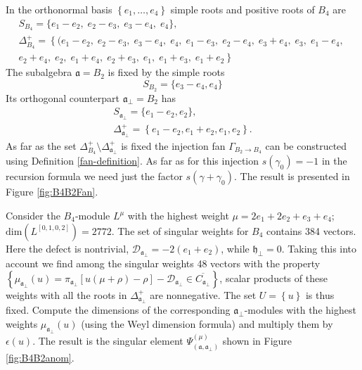 \documentclass[12pt]{iopart}
\theoremstyle{definition}
\newcommand{\af}{\mathfrak{a}}
\newcommand{\afb}{\mathfrak{a}_{\bot}}
\newcommand{\hf}{\mathfrak{h}}
\begin{document}
In the orthonormal basis $\left\{e_1,\dots,e_4\right\}$ simple roots and positive roots of $B_4$ are
\begin{eqnarray*}
  \label{eq:19}
  S_{B_4}= \{e_1 - e_2,\; e_2 - e_3,\; e_3 - e_4,\; e_4\},\\[2mm]
 \Delta^+_{B_4}=\left\{ (e_1 - e_2,\; e_2 - e_3,\; e_3 - e_4,\; e_4,\; e_1 - e_3,\; e_2 - e_4,\; e_3 + e_4,\; e_3,\; e_1 - e_4,\;\right.\\
 \left. e_2 + e_4,\; e_2,\; e_1 + e_4,\; e_2 + e_3,\; e_1,\; e_1 + e_3,\; e_1 + e_2\right\}
\end{eqnarray*}
The subalgebra $\af=B_2$ is fixed by the simple roots
\begin{equation*}
  \label{eq:26}
 S_{B_2}=\{e_3-e_4,e_4\}
\end{equation*}
Its orthogonal counterpart $\afb=B_2$ has
\begin{eqnarray*}
  \label{eq:27}
  S_{\afb}=\{e_1-e_2,e_2\},\\
 \Delta^{+}_{\afb}= \left\{e_1-e_2,e_1+e_2,e_1,e_2\right\}.
\end{eqnarray*}
As far as the set $\Delta^+_{B_4} \setminus  \Delta^{+}_{\afb}$ is fixed the injection
fan $\Gamma_{B_2 \to B_4}$ can be constructed using Definition \ref{fan-definition}.
As far as for this injection $s\left( \gamma_0\right)=-1$ in the recursion formula we need just the factor
 $s\left(\gamma + \gamma_0\right)$.
The result is presented in Figure \ref{fig:B4B2Fan}.


Consider the $B_4$-module $L^{\mu}$ with the highest weight $\mu=2e_1 + 2 e_2 + e_3 + e_4$; \,
$\mathrm{dim}(L^{\left[0,1,0,2\right]})=2772$.
The set of singular weights for $B_4$ contains 384 vectors.
Here the defect is nontrivial, $\mathcal{D}_{\af_{\perp }}=-2\left( e_1 + e_2 \right)$,
while $\hf_{\bot}=0$.
Taking this into account we find among the singular weights
48 vectors with the property $\left\{ \mu _{\af_{\perp }%
}\left( u\right) =\pi _{\af_{\perp }}\left[ u(\mu +\rho
)-\rho \right] -\mathcal{D}_{\af_{\perp }}\in \overline{C_{\af_{\perp }}}\right\} $,
scalar products of these weights with all the roots in $\Delta^{+}_{\afb}$ are nonnegative.
The set $U=\left\{ u \right\}$ is thus fixed.
Compute the dimensions of the corresponding $\afb$-modules with the highest weights
$ \mu _{\af_{\perp }}\left( u\right)$ (using the Weyl dimension formula) and multiply them
by $\epsilon\left( u \right)$. The result is the singular element
$\Psi ^{\left( \mu \right) }_{\left(  \af, \afb \right)}$ shown in Figure \ref{fig:B4B2anom}.
\end{document}
